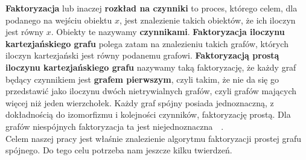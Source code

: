 \documentclass[12pt,a4paper,titlepage]{article}
\newcommand\tab[1][1cm]{\hspace*{#1}}
\begin{document}
\textbf{Faktoryzacja} lub inaczej \textbf{rozkład na czynniki} to proces, którego celem, dla podanego na wejściu obiektu $x$, jest znalezienie takich obiektów, że ich iloczyn jest równy $x$. Obiekty te nazywamy \textbf{czynnikami}. \textbf{Faktoryzacja iloczynu kartezjańskiego grafu} polega zatam na znalezieniu takich grafów, których iloczyn kartezjański jest równy podanemu grafowi. \textbf{ Faktoryzacją prostą iloczynu kartezjańskiego grafu} nazywamy taką faktoryzację, że każdy graf będący czynnikiem jest \textbf{grafem pierwszym}, czyli takim, że nie da się go przedstawić jako iloczynu dwóch nietrywialnych grafów, czyli grafów mających więcej niż jeden wierzchołek. Każdy graf spójny posiada jednoznaczną, z dokładnością do izomorfizmu i kolejności czynników, faktoryzację prostą. Dla grafów niespójnych faktoryzacja ta jest niejednoznaczna~\cite{SAB}~\cite{VIS}.\\
\tab[0.6cm]Celem naszej pracy jest właśnie znalezienie algorytmu faktoryzacji prostej grafu spójnego. Do tego celu potrzeba nam jeszcze kilku twierdzeń.

\newpage
\end{document}
